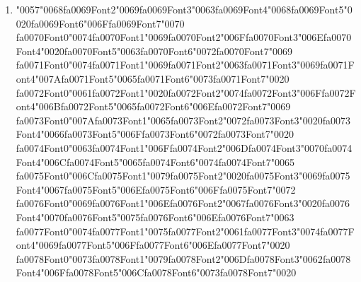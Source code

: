 \documentclass[11pt]{article}
\begin{document}
\begin{enumerate}[leftmargin=*]
  \item {\char"0057}{\char"0068}{\csname fa0069Font2\endcsname\char"0069}{\csname fa0069Font3\endcsname\char"0063}{\csname fa0069Font4\endcsname\char"0068}{\csname fa0069Font5\endcsname\char"0020}{\csname fa0069Font6\endcsname\char"006F}{\csname fa0069Font7\endcsname\char"0070} {\csname fa0070Font0\endcsname\char"0074}{\csname fa0070Font1\endcsname\char"0069}{\csname fa0070Font2\endcsname\char"006F}{\csname fa0070Font3\endcsname\char"006E}{\csname fa0070Font4\endcsname\char"0020}{\csname fa0070Font5\endcsname\char"0063}{\csname fa0070Font6\endcsname\char"0072}{\csname fa0070Font7\endcsname\char"0069} {\csname fa0071Font0\endcsname\char"0074}{\csname fa0071Font1\endcsname\char"0069}{\csname fa0071Font2\endcsname\char"0063}{\csname fa0071Font3\endcsname\char"0069}{\csname fa0071Font4\endcsname\char"007A}{\csname fa0071Font5\endcsname\char"0065}{\csname fa0071Font6\endcsname\char"0073}{\csname fa0071Font7\endcsname\char"0020} {\csname fa0072Font0\endcsname\char"0061}{\csname fa0072Font1\endcsname\char"0020}{\csname fa0072Font2\endcsname\char"0074}{\csname fa0072Font3\endcsname\char"006F}{\csname fa0072Font4\endcsname\char"006B}{\csname fa0072Font5\endcsname\char"0065}{\csname fa0072Font6\endcsname\char"006E}{\csname fa0072Font7\endcsname\char"0069} {\csname fa0073Font0\endcsname\char"007A}{\csname fa0073Font1\endcsname\char"0065}{\csname fa0073Font2\endcsname\char"0072}{\csname fa0073Font3\endcsname\char"0020}{\csname fa0073Font4\endcsname\char"0066}{\csname fa0073Font5\endcsname\char"006F}{\csname fa0073Font6\endcsname\char"0072}{\csname fa0073Font7\endcsname\char"0020} {\csname fa0074Font0\endcsname\char"0063}{\csname fa0074Font1\endcsname\char"006F}{\csname fa0074Font2\endcsname\char"006D}{\csname fa0074Font3\endcsname\char"0070}{\csname fa0074Font4\endcsname\char"006C}{\csname fa0074Font5\endcsname\char"0065}{\csname fa0074Font6\endcsname\char"0074}{\csname fa0074Font7\endcsname\char"0065} {\csname fa0075Font0\endcsname\char"006C}{\csname fa0075Font1\endcsname\char"0079}{\csname fa0075Font2\endcsname\char"0020}{\csname fa0075Font3\endcsname\char"0069}{\csname fa0075Font4\endcsname\char"0067}{\csname fa0075Font5\endcsname\char"006E}{\csname fa0075Font6\endcsname\char"006F}{\csname fa0075Font7\endcsname\char"0072} {\csname fa0076Font0\endcsname\char"0069}{\csname fa0076Font1\endcsname\char"006E}{\csname fa0076Font2\endcsname\char"0067}{\csname fa0076Font3\endcsname\char"0020}{\csname fa0076Font4\endcsname\char"0070}{\csname fa0076Font5\endcsname\char"0075}{\csname fa0076Font6\endcsname\char"006E}{\csname fa0076Font7\endcsname\char"0063} {\csname fa0077Font0\endcsname\char"0074}{\csname fa0077Font1\endcsname\char"0075}{\csname fa0077Font2\endcsname\char"0061}{\csname fa0077Font3\endcsname\char"0074}{\csname fa0077Font4\endcsname\char"0069}{\csname fa0077Font5\endcsname\char"006F}{\csname fa0077Font6\endcsname\char"006E}{\csname fa0077Font7\endcsname\char"0020} {\csname fa0078Font0\endcsname\char"0073}{\csname fa0078Font1\endcsname\char"0079}{\csname fa0078Font2\endcsname\char"006D}{\csname fa0078Font3\endcsname\char"0062}{\csname fa0078Font4\endcsname\char"006F}{\csname fa0078Font5\endcsname\char"006C}{\csname fa0078Font6\endcsname\char"0073}{\csname fa0078Font7\endcsname\char"0020} 
\end{enumerate}
\end{document}
